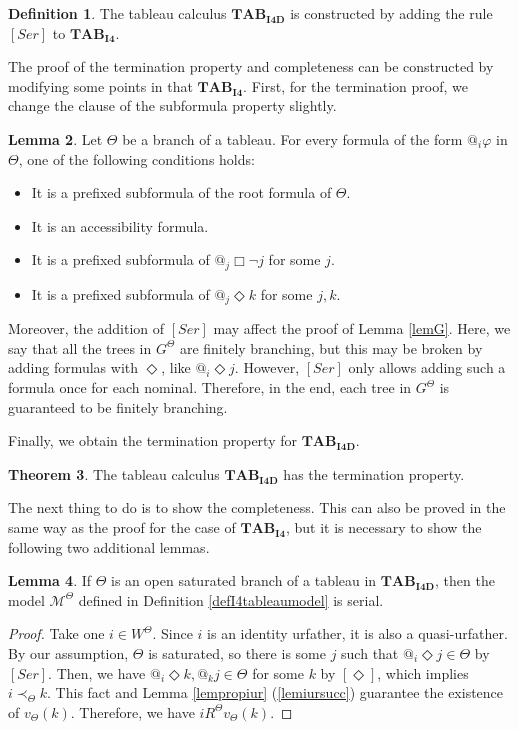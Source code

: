 \documentclass{article}
\theoremstyle{definition}
\newtheorem{definition}{Definition}[section]
\newtheorem{lemma}[definition]{Lemma}
\newtheorem{theorem}[definition]{Theorem}
\newcommand{\Dia}{\Diamond}
\newcommand{\Kmodel}{\mathcal{M}}
\newcommand{\ser}{\mathit{Ser}}
\newcommand{\tableauIF}{\mathbf{TAB}_{\mathbf{I4}}}
\newcommand{\tableauIFD}{\mathbf{TAB}_{\mathbf{I4D}}}
\begin{document}
\begin{definition}
    The tableau calculus $\tableauIFD$ is constructed by adding the rule $[\ser]$ to $\tableauIF$.
\end{definition}

The proof of the termination property and completeness can be constructed by modifying some points in that $\tableauIF$. First, for the termination proof, we change the clause of the subformula property slightly.

\begin{lemma}
  Let $\Theta$ be a branch of a tableau. For every formula of the form $@_i \varphi$ in $\Theta$, one of the following conditions holds:
  \begin{itemize}
      \item It is a prefixed subformula of the root formula of $\Theta$.
      \item It is an accessibility formula.
      \item It is a prefixed subformula of $@_j \Box \neg j$ for some $j$.
      \item It is a prefixed subformula of $@_j \Dia k$ for some $j, k$.
  \end{itemize}
  \label{lemquasiI4D}
\end{lemma}

Moreover, the addition of $[\ser]$ may affect the proof of Lemma \ref{lemG}. Here, we say that all the trees in $G^\Theta$ are finitely branching, but this may be broken by adding formulas with $\Dia$, like $@_i \Dia j$. However, $[\ser]$ only allows adding such a formula once for each nominal. Therefore, in the end, each tree in $G^\Theta$ is guaranteed to be finitely branching.

Finally, we obtain the termination property for $\tableauIFD$.

\begin{theorem}
    The tableau calculus $\tableauIFD$ has the termination property.
    \label{thmtermI4D}
\end{theorem}

The next thing to do is to show the completeness. This can also be proved in the same way as the proof for the case of $\tableauIF$, but it is necessary to show the following two additional lemmas.

\begin{lemma}
    If $\Theta$ is an open saturated branch of a tableau in $\tableauIFD$, then the model $\Kmodel^\Theta$ defined in Definition \ref{defI4tableaumodel} is serial.
\end{lemma}
\begin{proof}
    Take one $i \in W^\Theta$. Since $i$ is an identity urfather, it is also a quasi-urfather. By our assumption, $\Theta$ is saturated, so there is some $j$ such that $@_i \Dia j \in \Theta$ by $[\ser]$. Then, we have $@_i \Dia k, @_k j \in \Theta$ for some $k$ by $[\Dia]$, which implies $i \prec_\Theta k$. This fact and Lemma \ref{lempropiur} (\ref{lemiursucc}) guarantee the existence of $v_\Theta(k)$. Therefore, we have $i R^\Theta v_\Theta(k)$.
\end{proof}
\end{document}
